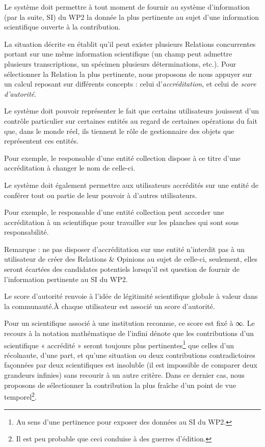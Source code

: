 \fon{}
Le système doit permettre à tout moment de fournir au système d'information (par la suite, SI) du WP2 la donnée la plus pertinente au sujet d'une information scientifique ouverte à la contribution.

La situation décrite en \in[s:relopi] établit qu'il peut exister plusieurs Relations concurrentes portant sur une même information scientifique (un champ peut admettre plusieurs transcriptions, un spécimen plusieurs déterminations, etc.).
Pour sélectionner la Relation la plus pertinente, nous proposons de nous appuyer sur un calcul reposant sur différents concepts : celui d'{\em accréditation}, et celui de {\em score d'autorité}.

\startsubsection[title={Notion d'accréditation}]

\fon{}
Le système doit pouvoir représenter le fait que certains utilisateurs jouissent d'un contrôle particulier sur certaines entités au regard de certaines opérations du fait que, dans le monde réel, ils tiennent le rôle de gestionnaire des objets que représentent ces entités.

Pour exemple, le responsable d'une entité collection dispose à ce titre d'une accréditation à changer le nom de celle-ci.

\bigskip

\fon{}
Le système doit également permettre aux utilisateurs accrédités sur une entité de conférer tout ou partie de leur pouvoir à d'autres utilisateurs.

Pour exemple, le responsable d'une entité collection peut accorder une accréditation à un scientifique pour travailler sur les planches qui sont sous responsabilité.

\bigskip

Remarque : ne pas disposer d'accréditation sur une entité n'interdit pas à un utilisateur de créer des Relations & Opinions au sujet de celle-ci, seulement, elles seront écartées des candidates potentiels lorsqu'il est question de fournir de l'information pertinente au SI du WP2.

\startsubsection[title={Notion de score d'autorité}] %

\fon{}
Le score d'autorité renvoie à l'idée de légitimité scientifique globale à valeur dans la communauté.À chaque utilisateur est associé un score d'autorité.

\leafa{} Pour un scientifique associé à une institution reconnue, ce score est fixé à ∞.
Le recours à la notation mathématique de l'infini dénote que les contributions d'un scientifique « accrédité » seront toujours plus pertinentes\footnote{Au sens d'une pertinence pour exposer des données au SI du WP2.} que celles d'un récolnaute, d'une part, et qu'une situation ou deux contributions contradictoires façonnées par deux scientifiques est insoluble (il est impossible de comparer deux grandeurs infinies) sans recourir à un autre critère.
Dans ce dernier cas, nous proposons de sélectionner la contribution la plus fraîche d'un point de vue temporel\footnote{Il est peu probable que ceci conduise à des guerres d'édition.}.

